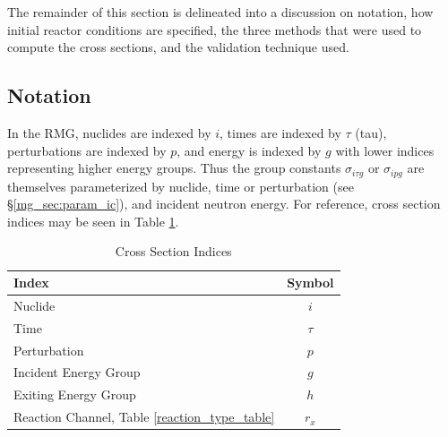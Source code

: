The remainder of this section is delineated into a discussion on notation, how initial 
reactor conditions are specified, the three methods that were used to compute the
cross sections, and the validation technique used.




\subsection{Notation}
\label{mg_sec:notation}
In the RMG, nuclides are indexed by $i$, times are indexed by $\tau$ (tau), perturbations are indexed by $p$, 
and energy is indexed by $g$ with lower indices representing higher energy groups.
Thus the group constants $\sigma_{i\tau g}$ or $\sigma_{ipg}$ are themselves parameterized by nuclide, 
time or perturbation (see \S \ref{mg_sec:param_ic}), and incident neutron energy.  
For reference, cross section indices may be seen in Table \ref{rmg_xs_ind}.

\begin{table}[htbp]
\begin{center}
\caption{Cross Section Indices}
\label{rmg_xs_ind}
\begin{tabular}{|l|c|}
\hline
\textbf{Index}        & \textbf{Symbol} \\
\hline
Nuclide               & $i$ \\
Time                  & $\tau$ \\
Perturbation          & $p$ \\
Incident Energy Group & $g$ \\
Exiting Energy Group  & $h$ \\
Reaction Channel, Table \ref{reaction_type_table} & $r_x$ \\
\hline
\end{tabular}
\end{center}
\end{table}


